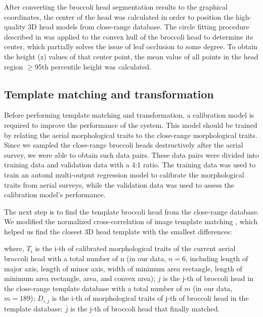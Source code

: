 

After converting the broccoli head segmentation results to the graphical coordinates, the center of the head was calculated in order to position the high-quality 3D head models from close-range database. The circle fitting procedure described in \citet{blok_image_2021} was applied to the convex hull of the broccoli head to determine its center, which partially solves the issue of leaf occlusion to some degree. To obtain the height (z) values of that center point, the mean value of all points in the head region $\geq$95th percentile height was calculated. 

\subsection{Template matching and transformation}

Before performing template matching and transformation, a calibration model is required to improve the performance of the system. This model should be trained by relating the aerial morphological traits to the close-range morphological traits. Since we sampled the close-range broccoli heads destructively after the aerial survey, we were able to obtain such data pairs. These data pairs were divided into training data and validation data with a 4:1 ratio. The training data was used to train an \gls{automl} multi-output regression model \citep{feurer_auto-sklearn_2020} to calibrate the morphological traits from aerial surveys, while the validation data was used to assess the calibration model's performance.

The next step is to find the template broccoli head from the close-range database. We modified the normalized cross-correlation of image template matching \citep{yoo_fast_2009}, which helped us find the closest 3D head template with the smallest differences:



\noindent
where, $T_i$ is the i-th of calibrated morphological traits of the current aerial broccoli head with a total number of n (in our data, $n=6$, including length of major axis, length of minor axis, width of minimum area rectangle, length of minimum area rectangle, area, and convex area); $j$ is the j-th of broccoli head in the close-range template database with a total number of $m$ (in our data, $m=189$); $D_{i,j}$ is the i-th of morphological traits of j-th of broccoli head in the template database; $\bar{j}$ is the j-th of broccoli head that finally matched.

